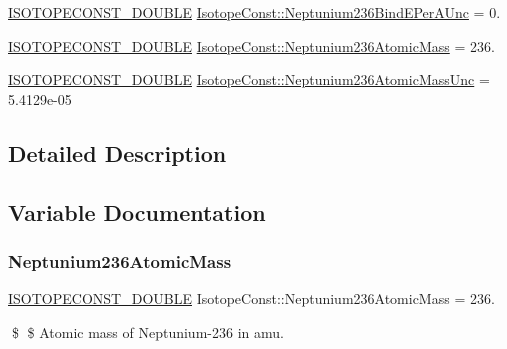 \begin{DoxyCompactItemize}
\mbox{\hyperlink{group___isotope_const-_macros_ga8f45a7272ce02c0b4c65c44636ed719a}{I\+S\+O\+T\+O\+P\+E\+C\+O\+N\+S\+T\+\_\+\+D\+O\+U\+B\+LE}} \mbox{\hyperlink{group___isotope_const-_neptunium-_np236_ga8fec5a224b035abba5fb98af7ed77d38}{Isotope\+Const\+::\+Neptunium236\+Bind\+E\+Per\+A\+Unc}} = 0.
\item 
\mbox{\hyperlink{group___isotope_const-_macros_ga8f45a7272ce02c0b4c65c44636ed719a}{I\+S\+O\+T\+O\+P\+E\+C\+O\+N\+S\+T\+\_\+\+D\+O\+U\+B\+LE}} \mbox{\hyperlink{group___isotope_const-_neptunium-_np236_gabd03bc9a037cacbadcd39ebae07d9c9d}{Isotope\+Const\+::\+Neptunium236\+Atomic\+Mass}} = 236.
\item 
\mbox{\hyperlink{group___isotope_const-_macros_ga8f45a7272ce02c0b4c65c44636ed719a}{I\+S\+O\+T\+O\+P\+E\+C\+O\+N\+S\+T\+\_\+\+D\+O\+U\+B\+LE}} \mbox{\hyperlink{group___isotope_const-_neptunium-_np236_gace2fb3d0030059a8c9a0f78a06c3aadb}{Isotope\+Const\+::\+Neptunium236\+Atomic\+Mass\+Unc}} = 5.\+4129e-\/05
\end{DoxyCompactItemize}


\subsection{Detailed Description}


\subsection{Variable Documentation}
\mbox{\label{group___isotope_const-_neptunium-_np236_gabd03bc9a037cacbadcd39ebae07d9c9d}} 
\subsubsection{\texorpdfstring{Neptunium236\+Atomic\+Mass}{Neptunium236AtomicMass}}
{\footnotesize\ttfamily \mbox{\hyperlink{group___isotope_const-_macros_ga8f45a7272ce02c0b4c65c44636ed719a}{I\+S\+O\+T\+O\+P\+E\+C\+O\+N\+S\+T\+\_\+\+D\+O\+U\+B\+LE}} Isotope\+Const\+::\+Neptunium236\+Atomic\+Mass = 236.}

\$ \$ Atomic mass of Neptunium-\/236 in amu. \mbox{\label{group___isotope_const-_neptunium-_np236_gace2fb3d0030059a8c9a0f78a06c3aadb}} 
